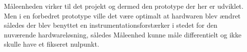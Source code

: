 
Måleenheden virker til det projekt og dermed den prototype der her er udviklet. Men i en forbedret prototype ville det være optimalt at hardwaren blev ændret således der blev benyttet en instrumentationsforstærker i stedet for den nuværende hardwareløsning, således Måleenhed kunne måle differentielt og ikke skulle have et fikseret nulpunkt.
